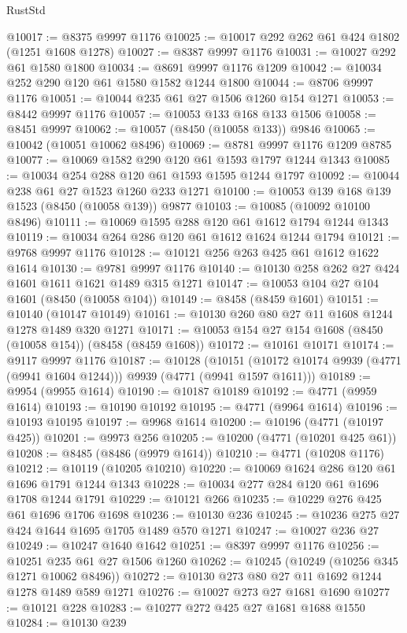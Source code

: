 \begin{lexlean}{RustStd}
\begin{coremodule}
@10017 := @8375 @9997 @1176
@10025 := @10017 @292 @262 @61 @424 @1802 (@1251 @1608 @1278)
@10027 := @8387 @9997 @1176
@10031 := @10027 @292 @61 @1580 @1800
@10034 := @8691 @9997 @1176 @1209
@10042 := @10034 @252 @290 @120 @61 @1580 @1582 @1244 @1800
@10044 := @8706 @9997 @1176
@10051 := @10044 @235 @61 @27 @1506 @1260 @154 @1271
@10053 := @8442 @9997 @1176
@10057 := @10053 @133 @168 @133 @1506
@10058 := @8451 @9997
@10062 := @10057 (@8450 (@10058 @133)) @9846
@10065 := @10042 (@10051 @10062 @8496)
@10069 := @8781 @9997 @1176 @1209 @8785
@10077 := @10069 @1582 @290 @120 @61 @1593 @1797 @1244 @1343
@10085 := @10034 @254 @288 @120 @61 @1593 @1595 @1244 @1797
@10092 := @10044 @238 @61 @27 @1523 @1260 @233 @1271
@10100 := @10053 @139 @168 @139 @1523 (@8450 (@10058 @139)) @9877
@10103 := @10085 (@10092 @10100 @8496)
@10111 := @10069 @1595 @288 @120 @61 @1612 @1794 @1244 @1343
@10119 := @10034 @264 @286 @120 @61 @1612 @1624 @1244 @1794
@10121 := @9768 @9997 @1176
@10128 := @10121 @256 @263 @425 @61 @1612 @1622 @1614
@10130 := @9781 @9997 @1176
@10140 := @10130 @258 @262 @27 @424 @1601 @1611 @1621 @1489 @315 @1271
@10147 := @10053 @104 @27 @104 @1601 (@8450 (@10058 @104))
@10149 := @8458 (@8459 @1601)
@10151 := @10140 (@10147 @10149)
@10161 := @10130 @260 @80 @27 @11 @1608 @1244 @1278 @1489 @320 @1271
@10171 := @10053 @154 @27 @154 @1608 (@8450 (@10058 @154)) (@8458 (@8459 @1608))
@10172 := @10161 @10171
@10174 := @9117 @9997 @1176
@10187 := @10128
    (@10151 (@10172 @10174 @9939 (@4771 (@9941 @1604 @1244))) @9939 (@4771 (@9941 @1597 @1611)))
@10189 := @9954 (@9955 @1614)
@10190 := @10187 @10189
@10192 := @4771 (@9959 @1614)
@10193 := @10190 @10192
@10195 := @4771 (@9964 @1614)
@10196 := @10193 @10195
@10197 := @9968 @1614
@10200 := @10196 (@4771 (@10197 @425))
@10201 := @9973 @256
@10205 := @10200 (@4771 (@10201 @425 @61))
@10208 := @8485 (@8486 (@9979 @1614))
@10210 := @4771 (@10208 @1176)
@10212 := @10119 (@10205 @10210)
@10220 := @10069 @1624 @286 @120 @61 @1696 @1791 @1244 @1343
@10228 := @10034 @277 @284 @120 @61 @1696 @1708 @1244 @1791
@10229 := @10121 @266
@10235 := @10229 @276 @425 @61 @1696 @1706 @1698
@10236 := @10130 @236
@10245 := @10236 @275 @27 @424 @1644 @1695 @1705 @1489 @570 @1271
@10247 := @10027 @236 @27
@10249 := @10247 @1640 @1642
@10251 := @8397 @9997 @1176
@10256 := @10251 @235 @61 @27 @1506 @1260
@10262 := @10245 (@10249 (@10256 @345 @1271 @10062 @8496))
@10272 := @10130 @273 @80 @27 @11 @1692 @1244 @1278 @1489 @589 @1271
@10276 := @10027 @273 @27 @1681 @1690
@10277 := @10121 @228
@10283 := @10277 @272 @425 @27 @1681 @1688 @1550
@10284 := @10130 @239

\end{coremodule}
\end{lexlean}

